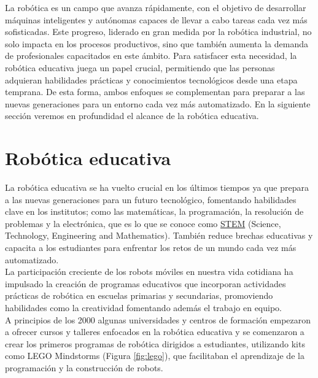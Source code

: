 La robótica es un campo que avanza rápidamente, con el objetivo de desarrollar máquinas inteligentes y autónomas capaces de llevar a cabo tareas cada vez más sofisticadas. Este progreso, liderado en gran medida por la robótica industrial, no solo impacta en los procesos productivos, sino que también aumenta la demanda de profesionales capacitados en este ámbito. Para satisfacer esta necesidad, la robótica educativa juega un papel crucial, permitiendo que las personas adquieran habilidades prácticas y conocimientos tecnológicos desde una etapa temprana. De esta forma, ambos enfoques se complementan para preparar a las nuevas generaciones para un entorno cada vez más automatizado. En la siguiente sección veremos en profundidad el alcance de la robótica educativa.


\section{Robótica educativa}
\label{sec:terceraseccion}


La robótica educativa se ha vuelto crucial en los últimos tiempos ya que prepara a las nuevas generaciones para un futuro tecnológico, fomentando habilidades clave en los institutos; como las matemáticas, la programación, la resolución de problemas y la electrónica, que es lo que se conoce como \hyperlink{STEM}{STEM} (Science, Technology, Engineering and Mathematics). También reduce brechas educativas y capacita a los estudiantes para enfrentar los retos de un mundo cada vez más automatizado.\\

La participación creciente de los robots móviles en nuestra vida cotidiana ha impulsado la creación de programas educativos que incorporan actividades prácticas de robótica en escuelas primarias y secundarias, promoviendo habilidades como la creatividad fomentando además el trabajo en equipo.\\


A principios de los 2000 algunas universidades y centros de formación empezaron a ofrecer cursos y talleres enfocados en la robótica educativa y se comenzaron a crear los primeros programas de robótica dirigidos a estudiantes, utilizando kits como LEGO Mindstorms (Figura \ref{fig:lego}), que facilitaban el aprendizaje de la programación y la construcción de robots.

